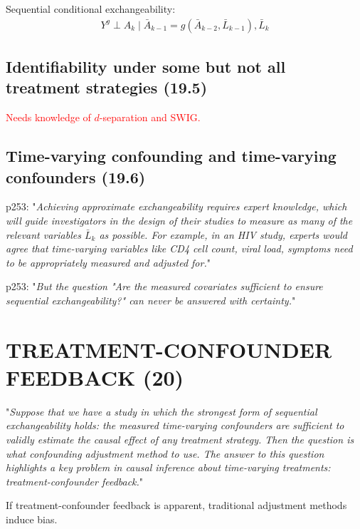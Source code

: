 \documentclass[11pt,a4paper,twoside]{book}\usepackage[]{graphicx}\usepackage[]{xcolor}
\begin{document}
Sequential conditional exchangeability:
\begin{align}
Y^g \perp A_k\mid \bar{A}_{k-1}=g\left(\bar{A}_{k-2}, \bar{L}_{k-1}\right),\bar{L}_k\label{eq:seqexch}
\end{align}

\subsection{Identifiability under some but not all treatment strategies (19.5)}

\textcolor{red}{Needs knowledge of $d$-separation and SWIG.}


\subsection{Time-varying confounding and time-varying confounders (19.6)}

p253: "\textit{Achieving approximate exchangeability requires expert knowledge,
which will guide investigators in the design of their studies to measure as
many of the relevant variables $\bar{L}_k$ as possible. For example, in an HIV study, experts would agree that time-varying variables like CD4 cell count, viral load, symptoms need to be appropriately measured and adjusted for.}"

p253: "\textit{But the question "Are the measured covariates sufficient to ensure sequential exchangeability?" can never be answered with certainty.}"

\section{TREATMENT-CONFOUNDER FEEDBACK (20)}

"\textit{Suppose that we have a study in which the strongest form of sequential exchangeability holds:
the measured time-varying confounders are sufficient to validly estimate the causal effect of any treatment strategy.
Then the question is what confounding adjustment method to use.
The answer to this question highlights a key problem in causal inference about time-varying treatments: treatment-confounder feedback.}"

If treatment-confounder feedback is apparent, traditional adjustment methods induce bias.

\end{document}
